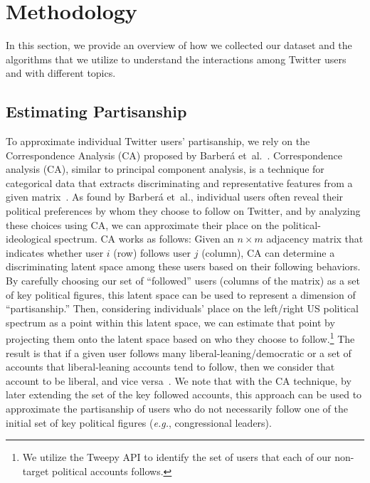 \section{Methodology}
In this section, we provide an overview of how we collected our dataset and the algorithms that we utilize to understand the interactions among Twitter users and with different topics. 

\subsection{Estimating Partisanship\label{sec:background-ca}}

To approximate individual Twitter users' partisanship, we rely on the Correspondence Analysis (CA) proposed by Barber{\'a} {et~al.}~\cite{barbera2015tweeting}.  Correspondence analysis (CA), similar to principal component analysis, is a technique for categorical data that extracts discriminating and representative features from a given matrix~\cite{greenacre2010correspondence}. As found by Barber{\'a} {et~al.}, individual users often reveal their political preferences by whom they choose to follow on Twitter, and by analyzing these choices using CA, we can approximate their place on the political-ideological spectrum. CA works as follows: Given an $n \times m$ adjacency matrix that indicates whether user $i$ (row) follows user $j$ (column), CA can determine a discriminating latent space among these users based on their following behaviors. By carefully choosing our set of ``followed'' users (columns of the matrix) as a set of key political figures, this latent space can be used to represent a dimension of ``partisanship.'' Then, considering individuals' place on the left/right US political spectrum as a point within this latent space, we can estimate that point by projecting them onto the latent space based on who they choose to follow.\footnote{We utilize the Tweepy API to identify the set of users that each of our non-target political accounts follows.} The result is that if a given user follows many liberal-leaning/democratic or a set of accounts that liberal-leaning accounts tend to follow, then we consider that account to be liberal, and vice versa~\cite{barbera2015tweeting,mcpherson2001birds}. We note that with the CA technique, by later extending the set of the key followed accounts, this approach can be used to approximate the partisanship of users who do not necessarily follow one of the initial set of key political figures (\textit{e.g.}, congressional leaders).

